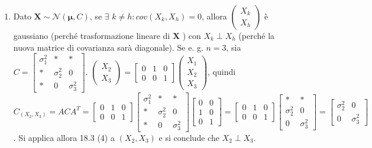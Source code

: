 \documentclass{article}
\begin{document}
\begin{enumerate}
\item Dato $\mathbf{X}\sim \mathcal{N}\left( \mathbf{\mu },C\right) $, se $%
\exists $ $k\neq h:cov\left( X_{k},X_{h}\right) =0$, allora $\left( 
\begin{array}{c}
X_{k} \\ 
X_{h}%
\end{array}%
\right) $ \`{e} gaussiano (perch\'{e} trasformazione lineare di $\mathbf{X}$%
) con $X_{k}\perp X_{h}$ (perch\'{e} la nuova matrice di covarianza sar\`{a}
diagonale). Se e. g. $n=3$, sia $C=\left[ 
\begin{array}{ccc}
\sigma _{1}^{2} & \ast & \ast \\ 
\ast & \sigma _{2}^{2} & 0 \\ 
\ast & 0 & \sigma _{3}^{2}%
\end{array}%
\right] $. $\left( 
\begin{array}{c}
X_{2} \\ 
X_{3}%
\end{array}%
\right) =\left[ 
\begin{array}{ccc}
0 & 1 & 0 \\ 
0 & 0 & 1%
\end{array}%
\right] \left( 
\begin{array}{c}
X_{1} \\ 
X_{2} \\ 
X_{3}%
\end{array}%
\right) $, quindi $C_{\left( X_{2},X_{3}\right) }=ACA^{T}=\left[ 
\begin{array}{ccc}
0 & 1 & 0 \\ 
0 & 0 & 1%
\end{array}%
\right] \left[ 
\begin{array}{ccc}
\sigma _{1}^{2} & \ast & \ast \\ 
\ast & \sigma _{2}^{2} & 0 \\ 
\ast & 0 & \sigma _{3}^{2}%
\end{array}%
\right] \left[ 
\begin{array}{cc}
0 & 0 \\ 
1 & 0 \\ 
0 & 1%
\end{array}%
\right] =\left[ 
\begin{array}{ccc}
0 & 1 & 0 \\ 
0 & 0 & 1%
\end{array}%
\right] \left[ 
\begin{array}{cc}
\ast & \ast \\ 
\sigma _{2}^{2} & 0 \\ 
0 & \sigma _{3}^{2}%
\end{array}%
\right] =\left[ 
\begin{array}{cc}
\sigma _{2}^{2} & 0 \\ 
0 & \sigma _{3}^{2}%
\end{array}%
\right] $. Si applica allora 18.3 (4) a $\left( X_{2},X_{3}\right) $ e si
conclude che $X_{2}\perp X_{3}$.
\end{enumerate}
\end{document}
